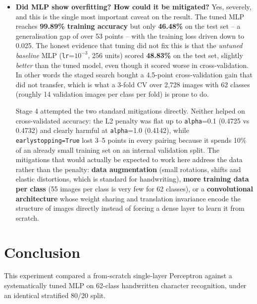 \documentclass[12pt,a4paper]{article}
\DeclareRobustCommand{\_}{\textunderscore\allowbreak}
\begin{document}
\begin{itemize}
No. Stage 3 tested two-layer networks
\texttt{(256,128)} and \texttt{(512,256)} against single hidden layers, and a
single wide layer \texttt{(512,)} won (0.4732). With only 2{,}728 training
images and 1{,}024 inputs, a second hidden layer adds parameters to a model
that is already capable of memorising the training set (it reaches 99.89\%
training accuracy) without adding usable generalisation. Depth pays off when
there is enough data to constrain it; here there is not.
\item \textbf{Did MLP show overfitting? How could it be mitigated?}
Yes, severely, and this is the single most
important caveat on the result. The tuned MLP reaches \textbf{99.89\%
training accuracy} but only \textbf{46.48\%} on the test set -- a
generalisation gap of over 53 points -- with the training loss driven down to
0.025. The honest evidence that tuning did not fix this is that the
\emph{untuned baseline} MLP (\texttt{lr}=$10^{-3}$, 256 units) scored
\textbf{48.83\%} on the test set, slightly \emph{better} than the tuned model,
even though it scored worse in cross-validation. In other words the staged
search bought a 4.5-point cross-validation gain that did not transfer, which
is what a 3-fold CV over 2{,}728 images with 62 classes (roughly 14 validation
images per class per fold) is prone to do.

Stage 4 attempted the two standard mitigations directly. Neither helped on
cross-validated accuracy: the L2 penalty was flat up to \texttt{alpha}=0.1
(0.4725 vs 0.4732) and clearly harmful at \texttt{alpha}=1.0 (0.4142), while
\texttt{early\_stopping=True} lost 3--5 points in every pairing because it
spends 10\% of an already small training set on an internal validation split.
The mitigations that would actually be expected to work here address the data
rather than the penalty: \textbf{data augmentation} (small rotations, shifts
and elastic distortions, which is standard for handwriting), \textbf{more
training data per class} (55 images per class is very few for 62 classes), or
a \textbf{convolutional architecture} whose weight sharing and translation
invariance encode the structure of images directly instead of forcing a dense
layer to learn it from scratch.
\end{itemize}

\section{Conclusion}
This experiment compared a from-scratch single-layer
Perceptron against a systematically tuned MLP on 62-class handwritten
character recognition, under an identical stratified 80/20 split.
\end{document}
